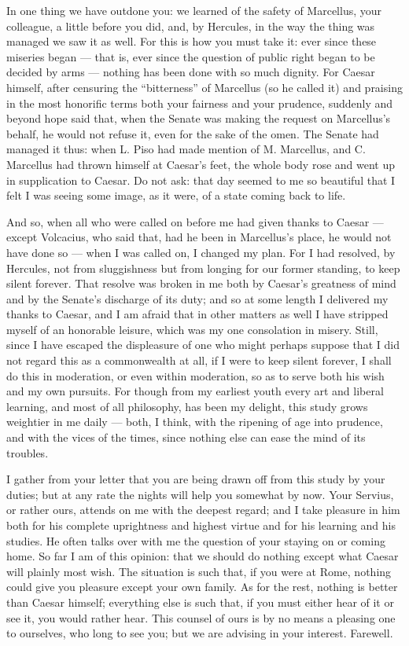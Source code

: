  In one thing we have outdone you: we learned of the safety of Marcellus, your colleague, a little before you did, and, by Hercules, in the way the thing was managed we saw it as well. For this is how you must take it: ever since these miseries began --- that is, ever since the question of public right began to be decided by arms --- nothing has been done with so much dignity. For Caesar himself, after censuring the ``bitterness'' of Marcellus (so he called it) and praising in the most honorific terms both your fairness and your prudence, suddenly and beyond hope said that, when the Senate was making the request on Marcellus's behalf, he would not refuse it, even for the sake of the omen. The Senate had managed it thus: when L. Piso had made mention of M. Marcellus, and C. Marcellus had thrown himself at Caesar's feet, the whole body rose and went up in supplication to Caesar. Do not ask: that day seemed to me so beautiful that I felt I was seeing some image, as it were, of a state coming back to life.

 And so, when all who were called on before me had given thanks to Caesar --- except Volcacius, who said that, had he been in Marcellus's place, he would not have done so --- when I was called on, I changed my plan. For I had resolved, by Hercules, not from sluggishness but from longing for our former standing, to keep silent forever. That resolve was broken in me both by Caesar's greatness of mind and by the Senate's discharge of its duty; and so at some length I delivered my thanks to Caesar, and I am afraid that in other matters as well I have stripped myself of an honorable leisure, which was my one consolation in misery. Still, since I have escaped the displeasure of one who might perhaps suppose that I did not regard this as a commonwealth at all, if I were to keep silent forever, I shall do this in moderation, or even within moderation, so as to serve both his wish and my own pursuits. For though from my earliest youth every art and liberal learning, and most of all philosophy, has been my delight, this study grows weightier in me daily --- both, I think, with the ripening of age into prudence, and with the vices of the times, since nothing else can ease the mind of its troubles.

 I gather from your letter that you are being drawn off from this study by your duties; but at any rate the nights will help you somewhat by now. Your Servius, or rather ours, attends on me with the deepest regard; and I take pleasure in him both for his complete uprightness and highest virtue and for his learning and his studies. He often talks over with me the question of your staying on or coming home. So far I am of this opinion: that we should do nothing except what Caesar will plainly most wish. The situation is such that, if you were at Rome, nothing could give you pleasure except your own family. As for the rest, nothing is better than Caesar himself; everything else is such that, if you must either hear of it or see it, you would rather hear. This counsel of ours is by no means a pleasing one to ourselves, who long to see you; but we are advising in your interest. Farewell.
